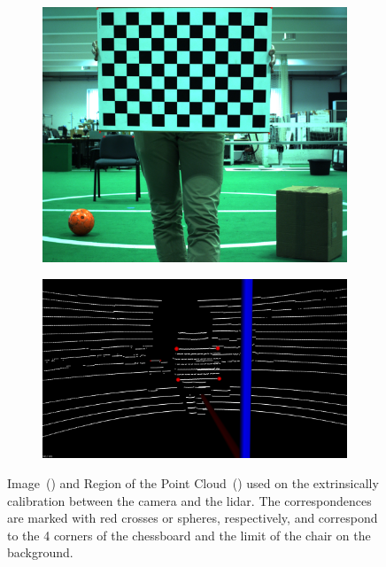 \begin{figure}[H]
	\centering
	\begin{subfigure}[c]{0.39\textwidth}
		\includegraphics[width=\textwidth]{img/calibration/camera-extrinsic-calibration-points.jpg}
		\caption{}
		\label{fig:extrinsic-calibration-correspondences:camera}
	\end{subfigure}
	\qquad
	\begin{subfigure}[c]{0.55\textwidth}
		\includegraphics[width=\textwidth]{img/calibration/lidar-extrinsic-calibration-points.png}
		\caption{}
		\label{fig:extrinsic-calibration-correspondences:lidar}
	\end{subfigure}
	\caption{Image~() and Region of the Point Cloud~() used on the extrinsically calibration between the camera and the \ac{lidar}. The correspondences are marked with red crosses or spheres, respectively, and correspond to the 4 corners of the chessboard and the limit of the chair on the background.}
	\label{fig:calibration-correspondences}
\end{figure}

